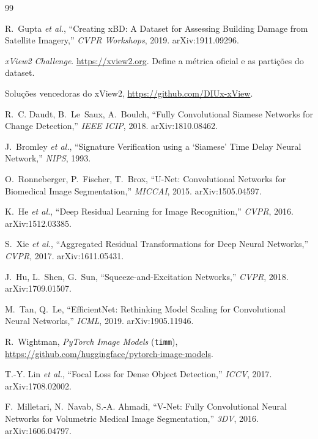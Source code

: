 \documentclass[11pt,a4paper]{article}
\begin{document}
\begin{thebibliography}{99}
\small

R.~Gupta \emph{et al.},
\newblock ``Creating xBD: A Dataset for Assessing Building Damage from Satellite
Imagery,''
\newblock \emph{CVPR Workshops}, 2019. arXiv:1911.09296.

\newblock \emph{xView2 Challenge}. \url{https://xview2.org}.
\newblock Define a métrica oficial e as partições do dataset.

\newblock Soluções vencedoras do xView2, \url{https://github.com/DIUx-xView}.

R.~C. Daudt, B.~Le~Saux, A.~Boulch,
\newblock ``Fully Convolutional Siamese Networks for Change Detection,''
\newblock \emph{IEEE ICIP}, 2018. arXiv:1810.08462.

J.~Bromley \emph{et al.},
\newblock ``Signature Verification using a `Siamese' Time Delay Neural
Network,''
\newblock \emph{NIPS}, 1993.

O.~Ronneberger, P.~Fischer, T.~Brox,
\newblock ``U-Net: Convolutional Networks for Biomedical Image Segmentation,''
\newblock \emph{MICCAI}, 2015. arXiv:1505.04597.

K.~He \emph{et al.},
\newblock ``Deep Residual Learning for Image Recognition,''
\newblock \emph{CVPR}, 2016. arXiv:1512.03385.

S.~Xie \emph{et al.},
\newblock ``Aggregated Residual Transformations for Deep Neural Networks,''
\newblock \emph{CVPR}, 2017. arXiv:1611.05431.

J.~Hu, L.~Shen, G.~Sun,
\newblock ``Squeeze-and-Excitation Networks,''
\newblock \emph{CVPR}, 2018. arXiv:1709.01507.

M.~Tan, Q.~Le,
\newblock ``EfficientNet: Rethinking Model Scaling for Convolutional Neural
Networks,''
\newblock \emph{ICML}, 2019. arXiv:1905.11946.

R.~Wightman,
\newblock \emph{PyTorch Image Models} (\texttt{timm}),
\newblock \url{https://github.com/huggingface/pytorch-image-models}.

T.-Y. Lin \emph{et al.},
\newblock ``Focal Loss for Dense Object Detection,''
\newblock \emph{ICCV}, 2017. arXiv:1708.02002.

F.~Milletari, N.~Navab, S.-A. Ahmadi,
\newblock ``V-Net: Fully Convolutional Neural Networks for Volumetric Medical
Image Segmentation,''
\newblock \emph{3DV}, 2016. arXiv:1606.04797.


\end{thebibliography}
\end{document}
